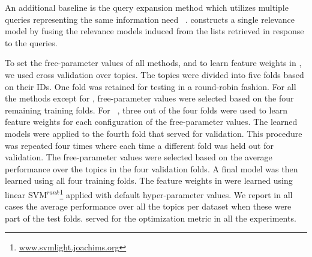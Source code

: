 An additional baseline is the query expansion method \ariRM
which utilizes multiple queries representing the same information need
~\cite{Lu+al:19a}. \ariRM constructs a single relevance model by fusing the relevance models induced from the lists retrieved in response to the queries. 



To set the free-parameter values of all methods, and to learn feature weights in \clustMRF, we used cross validation over topics. The topics were divided into five folds based on their IDs. One fold was retained for testing in a round-robin fashion. For all the methods except for \clustMRF, free-parameter values were selected based on the four remaining training folds. For \clustMRF~\cite{Raiber+Kurland:13a}, three out of the four folds were used to learn feature weights for each configuration of the free-parameter values. The learned models were applied to the fourth fold that served for validation. This procedure was repeated four times where each time a different fold was held out for validation. The free-parameter values were selected based on the average performance over the topics in the four validation folds. A final model was then learned using all four training folds. The feature weights in \clustMRF were learned using linear SVM$^{rank}$\footnote{\url{www.svmlight.joachims.org}} applied with default hyper-parameter values. We report in all cases the average performance over all the topics per dataset when these were part of the test folds. \map served for the optimization metric in all the experiments.

